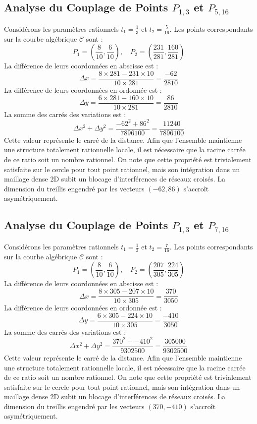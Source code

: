 \documentclass[12pt, a4paper]{article}
\begin{document}
\subsection{Analyse du Couplage de Points $P_{1,3}$ et $P_{5,16}$}
Considérons les paramètres rationnels $t_1 = \frac{1}{3}$ et $t_2 = \frac{5}{16}$.
Les points correspondants sur la courbe algébrique $\mathcal{C}$ sont :
$$ P_1 = \left( \frac{8}{10}, \frac{6}{10} \right), \quad P_2 = \left( \frac{231}{281}, \frac{160}{281} \right) $$
La différence de leurs coordonnées en abscisse est :
$$ \Delta x = \frac{8 \times 281 - 231 \times 10}{10 \times 281} = \frac{-62}{2810} $$
La différence de leurs coordonnées en ordonnée est :
$$ \Delta y = \frac{6 \times 281 - 160 \times 10}{10 \times 281} = \frac{86}{2810} $$
La somme des carrés des variations est :
$$ \Delta x^2 + \Delta y^2 = \frac{ -62^2 + 86^2 }{ 7896100 } = \frac{ 11240 }{ 7896100 } $$
Cette valeur représente le carré de la distance. Afin que l'ensemble maintienne une structure totalement rationnelle locale, il est nécessaire que la racine carrée de ce ratio soit un nombre rationnel. On note que cette propriété est trivialement satisfaite sur le cercle pour tout point rationnel, mais son intégration dans un maillage dense 2D subit un blocage d'interférences de réseaux croisés. La dimension du treillis engendré par les vecteurs $( -62, 86 )$ s'accroît asymétriquement.


\subsection{Analyse du Couplage de Points $P_{1,3}$ et $P_{7,16}$}
Considérons les paramètres rationnels $t_1 = \frac{1}{3}$ et $t_2 = \frac{7}{16}$.
Les points correspondants sur la courbe algébrique $\mathcal{C}$ sont :
$$ P_1 = \left( \frac{8}{10}, \frac{6}{10} \right), \quad P_2 = \left( \frac{207}{305}, \frac{224}{305} \right) $$
La différence de leurs coordonnées en abscisse est :
$$ \Delta x = \frac{8 \times 305 - 207 \times 10}{10 \times 305} = \frac{370}{3050} $$
La différence de leurs coordonnées en ordonnée est :
$$ \Delta y = \frac{6 \times 305 - 224 \times 10}{10 \times 305} = \frac{-410}{3050} $$
La somme des carrés des variations est :
$$ \Delta x^2 + \Delta y^2 = \frac{ 370^2 + -410^2 }{ 9302500 } = \frac{ 305000 }{ 9302500 } $$
Cette valeur représente le carré de la distance. Afin que l'ensemble maintienne une structure totalement rationnelle locale, il est nécessaire que la racine carrée de ce ratio soit un nombre rationnel. On note que cette propriété est trivialement satisfaite sur le cercle pour tout point rationnel, mais son intégration dans un maillage dense 2D subit un blocage d'interférences de réseaux croisés. La dimension du treillis engendré par les vecteurs $( 370, -410 )$ s'accroît asymétriquement.
\end{document}

